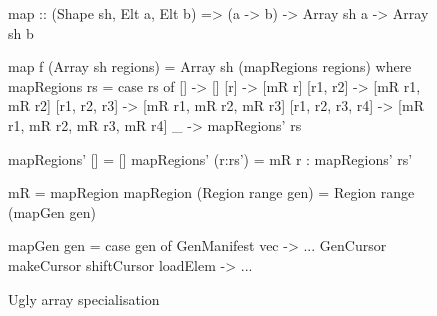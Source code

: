 \begin{figure}
\begin{small}
\begin{code}
map :: (Shape sh, Elt a, Elt b) => (a -> b)
    -> Array sh a -> Array sh b

map f (Array sh regions)
 = Array sh (mapRegions regions)
 where	
  mapRegions rs
   = case rs of
      []               -> []
      [r]              -> [mR r]
      [r1, r2]         -> [mR r1, mR r2]
      [r1, r2, r3]     -> [mR r1, mR r2, mR r3]
      [r1, r2, r3, r4] -> [mR r1, mR r2, mR r3, mR r4]
      _                -> mapRegions' rs

  mapRegions' []      = []
  mapRegions' (r:rs') = mR r : mapRegions' rs'

  mR  = mapRegion
  mapRegion (Region range gen)
      = Region range (mapGen gen)

  mapGen gen
   = case gen of
      GenManifest vec -> ...
      GenCursor makeCursor shiftCursor loadElem -> ...
\end{code}
\end{small}
\caption{Ugly array specialisation}
\label{figure:UglySpecialisation}
\end{figure}


